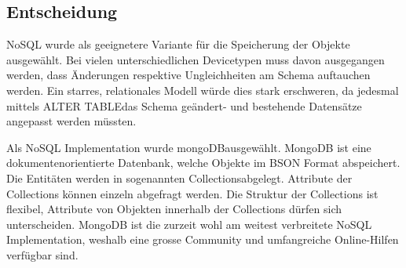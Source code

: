 \subsection{Entscheidung}
NoSQL wurde als geeignetere Variante für die Speicherung der Objekte ausgewählt. Bei vielen unterschiedlichen Devicetypen muss davon ausgegangen werden, dass Änderungen respektive Ungleichheiten am Schema auftauchen werden. Ein starres, relationales Modell würde dies stark erschweren, da jedesmal mittels \glqq ALTER TABLE\grqq  das Schema geändert- und bestehende Datensätze angepasst werden müssten.

Als NoSQL Implementation wurde \glqq mongoDB\grqq ausgewählt. MongoDB ist eine dokumentenorientierte Datenbank, welche Objekte im BSON Format abspeichert. Die Entitäten werden in sogenannten \glqq Collections\grqq  abgelegt. Attribute der Collections können einzeln abgefragt werden. Die Struktur der Collections ist flexibel, Attribute von Objekten innerhalb der Collections dürfen sich unterscheiden. MongoDB ist die zurzeit wohl am weitest verbreitete NoSQL Implementation, weshalb eine grosse Community und umfangreiche Online-Hilfen verfügbar sind.
 




